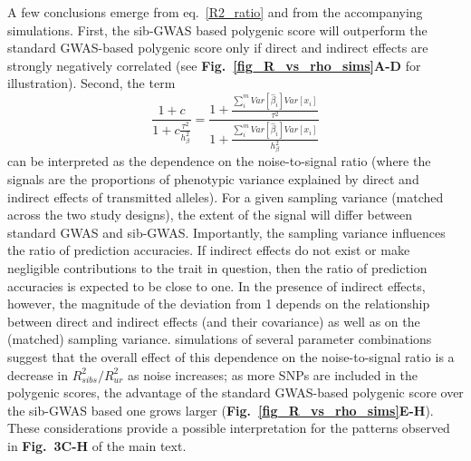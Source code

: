 \documentclass[hidelinks, 12pt]{article}
\begin{document}
 A few conclusions emerge from eq.~\ref{R2_ratio} and from the accompanying simulations.  First, the sib-GWAS based polygenic score will outperform the standard GWAS-based polygenic score only if direct and indirect effects are strongly negatively correlated (see {\bf Fig.~\ref{fig_R_vs_rho_sims}A-D} for illustration).   Second, the term
\begin{equation}
\frac{1+c}{1+c\frac{\tau^2}{h_\beta^2}}=\frac{1+\frac{\sum_i^mVar[\hat{\beta}_i]Var[x_i]}{\tau^2}}{1+\frac{\sum_i^mVar[\hat{\beta}_i]Var[x_i]}{h_{\beta}^2}}
\end{equation}
can be interpreted as the dependence on the noise-to-signal ratio (where the signals are the proportions of phenotypic variance explained by direct and indirect effects of transmitted alleles). For a given sampling variance (matched across the two study designs), the extent of the signal will differ between standard GWAS and sib-GWAS.  Importantly, the sampling variance influences the ratio of prediction accuracies.  If indirect effects do not exist or make negligible contributions to the trait in question, then the ratio of prediction accuracies is expected to be close to one.  In the presence of indirect effects, however, the magnitude of the deviation from 1 depends on the relationship between direct and indirect effects (and their covariance) as well as on the (matched) sampling variance. simulations of several parameter combinations suggest that the overall effect of this dependence on the noise-to-signal ratio is a decrease in $R^2_{sibs}/R^2_{ur}$  as noise increases; as more SNPs are included in the polygenic scores, the advantage of the standard GWAS-based polygenic score over the sib-GWAS based one grows larger ({\bf Fig.~\ref{fig_R_vs_rho_sims}E-H}). These considerations provide a possible interpretation for the patterns observed in {\bf Fig.~3C-H} of the main text.

\vspace{0.5cm}
\end{document}
